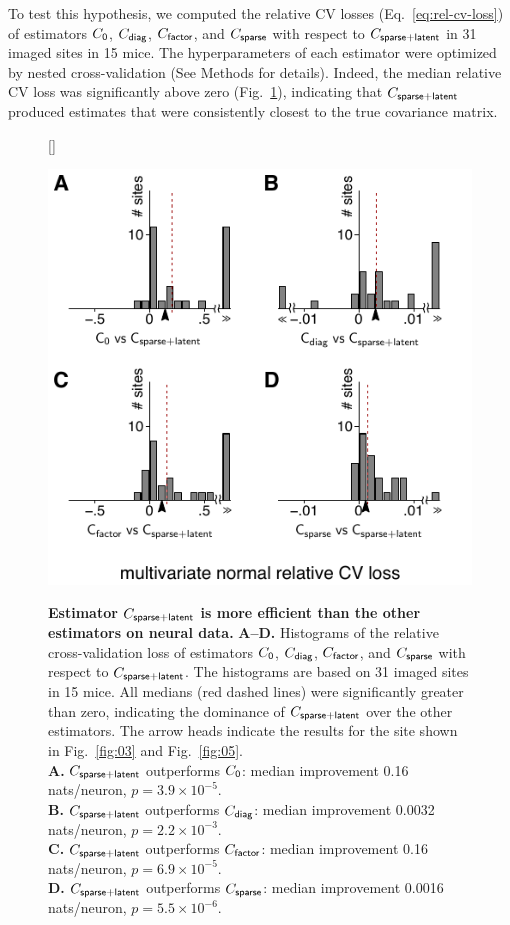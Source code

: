 \documentclass[10pt]{article}
\begin{document}
To test this hypothesis, we computed the relative CV losses (Eq.~\ref{eq:rel-cv-loss}) of estimators  $C_{\sf 0}$, $C_{\sf diag}$, $C_{\sf factor}$, and $C_{\sf sparse}$ with respect to $C_{\sf sparse+latent}$ in 31 imaged sites in 15 mice.  The hyperparameters of each estimator were optimized by nested cross-validation (See Methods for details). Indeed, the median relative CV loss was significantly above zero (Fig.~\ref{fig:04}), indicating that $C_{\sf sparse+latent}$ produced estimates that were consistently closest to the true covariance matrix.
\begin{figure}[!ht]    [\FBwidth]
    {\caption{{\bf Estimator $C_{\sf sparse+latent}$ is more efficient than the other estimators on neural data.}
    {\bf A--D.} Histograms of the relative cross-validation loss of estimators $C_{\sf 0}$, $C_{\sf diag}$, $C_{\sf factor}$, and $C_{\sf sparse}$ with respect to $C_{\sf sparse+latent}$.
    The histograms are based on 31 imaged sites in 15 mice. 
    All medians (red dashed lines) were significantly greater than zero, indicating the dominance of $C_{\sf sparse+latent}$ over the other estimators. 
    The arrow heads indicate the results for the site shown in Fig.~\ref{fig:03} and Fig.~\ref{fig:05}.
\\{\bf A.} $C_{\sf sparse+latent}$ outperforms $C_{\sf 0}$: median improvement 0.16 nats/neuron, $p=3.9\times 10^{-5}$.
\\{\bf B.} $C_{\sf sparse+latent}$ outperforms $C_{\sf diag}$: median improvement 0.0032 nats/neuron, $p=2.2\times 10^{-3}$.
\\{\bf C.} $C_{\sf sparse+latent}$ outperforms $C_{\sf factor}$: median improvement 0.16 nats/neuron, $p=6.9\times 10^{-5}$.
\\{\bf D.} $C_{\sf sparse+latent}$ outperforms $C_{\sf sparse}$: median improvement 0.0016 nats/neuron, $p=5.5\times 10^{-6}$.
} \label{fig:04}}
    {\includegraphics{./figures/Figure04.pdf}}
\end{figure}
\end{document}

